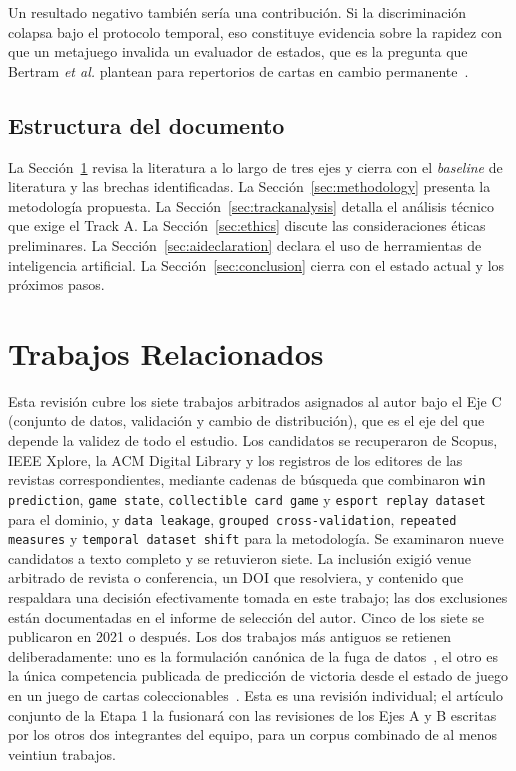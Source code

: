 \documentclass[conference]{IEEEtran}
\newcommand{\code}[1]{\texttt{#1}}
\begin{document}
Un resultado negativo tambi\'en ser\'ia una contribuci\'on. Si la
discriminaci\'on colapsa bajo el protocolo temporal, eso constituye
evidencia sobre la rapidez con que un metajuego invalida un evaluador de
estados, que es la pregunta que Bertram \textit{et al.} plantean para
repertorios de cartas en cambio
permanente~\cite{bertram_cardrepresentations_2024}.

\subsection{Estructura del documento}
\label{subsec:structure}
La Secci\'on~\ref{sec:related} revisa la literatura a lo largo de tres ejes
y cierra con el \emph{baseline} de literatura y las brechas identificadas.
La Secci\'on~\ref{sec:methodology} presenta la metodolog\'ia propuesta. La
Secci\'on~\ref{sec:trackanalysis} detalla el an\'alisis t\'ecnico que exige
el Track A. La Secci\'on~\ref{sec:ethics} discute las consideraciones
\'eticas preliminares. La Secci\'on~\ref{sec:aideclaration} declara el uso
de herramientas de inteligencia artificial. La
Secci\'on~\ref{sec:conclusion} cierra con el estado actual y los pr\'oximos
pasos.

\section{Trabajos Relacionados}
\label{sec:related}

Esta revisi\'on cubre los siete trabajos arbitrados asignados al autor bajo
el Eje C (conjunto de datos, validaci\'on y cambio de distribuci\'on), que
es el eje del que depende la validez de todo el estudio. Los candidatos se
recuperaron de Scopus, IEEE Xplore, la ACM Digital Library y los registros
de los editores de las revistas correspondientes, mediante cadenas de
b\'usqueda que combinaron \code{win prediction}, \code{game state},
\code{collectible card game} y \code{esport replay dataset} para el
dominio, y \code{data leakage}, \code{grouped cross-validation},
\code{repeated measures} y \code{temporal dataset shift} para la
metodolog\'ia. Se examinaron nueve candidatos a texto completo y se
retuvieron siete. La inclusi\'on exigi\'o venue arbitrado de revista o
conferencia, un DOI que resolviera, y contenido que respaldara una
decisi\'on efectivamente tomada en este trabajo; las dos exclusiones est\'an
documentadas en el informe de selecci\'on del autor. Cinco de los siete se
publicaron en 2021 o despu\'es. Los dos trabajos m\'as antiguos se retienen
deliberadamente: uno es la formulaci\'on can\'onica de la fuga de
datos~\cite{kaufman_leakage_2011}, el otro es la \'unica competencia
publicada de predicci\'on de victoria desde el estado de juego en un juego
de cartas coleccionables~\cite{janusz_hearthstone_2017}. Esta es una
revisi\'on individual; el art\'iculo conjunto de la Etapa 1 la fusionar\'a
con las revisiones de los Ejes A y B escritas por los otros dos integrantes
del equipo, para un corpus combinado de al menos veintiun trabajos.
\end{document}
